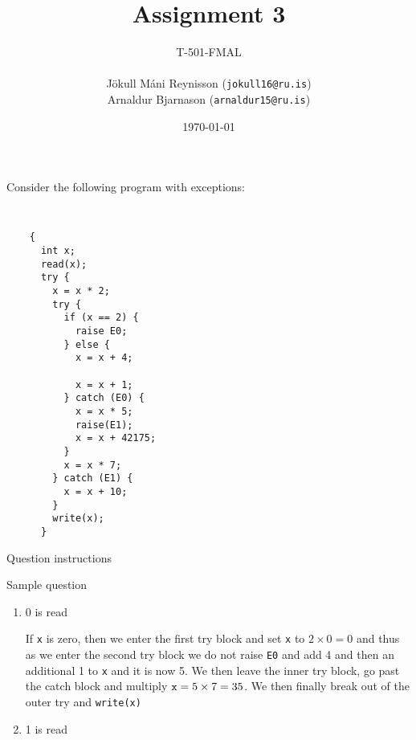 \documentclass[11pt]{exam}
\begin{document}
\title{Assignment 3}
    \author{{\small T-501-FMAL} \\ \quad \\ Jökull Máni Reynisson ({\tt jokull16@ru.is}) \\  Arnaldur Bjarnason ({\tt arnaldur15@ru.is})}
\date{\today}
\maketitle

\begin{questions}


\question Consider the following program with exceptions:
{\tt
  \begin{lstlisting}
    {
      int x;
      read(x);
      try {
        x = x * 2;
        try {
          if (x == 2) {
            raise E0;
          } else {
            x = x + 4;

            x = x + 1;
          } catch (E0) {
            x = x * 5;
            raise(E1);
            x = x + 42175;
          }
          x = x * 7;
        } catch (E1) {
          x = x + 10;
        }
        write(x);
      }
  \end{lstlisting}
}	\quad

	Question instructions

	\begin{framed}


	\end{framed}
	\question Sample question

        \begin{enumerate}[label=(\roman*)]
            \item 0 is read
                \begin{framed}
                    If {\tt x} is zero, then we enter the first try block and set {\tt x} to $2\times 0 = 0$ and thus as we enter the second try block we do not raise {\tt E0} and add 4 and then an additional 1 to {\tt x} and it is now 5. We then leave the inner try block, go past the catch block and multiply ${\tt x} = 5 \times 7 = 35$. We then finally break out of the outer try and {\tt write(x)}
                \end{framed}

            \item 1 is read
                \begin{framed}
                \end{framed}
        \end{enumerate}




\end{questions}
\end{document}

